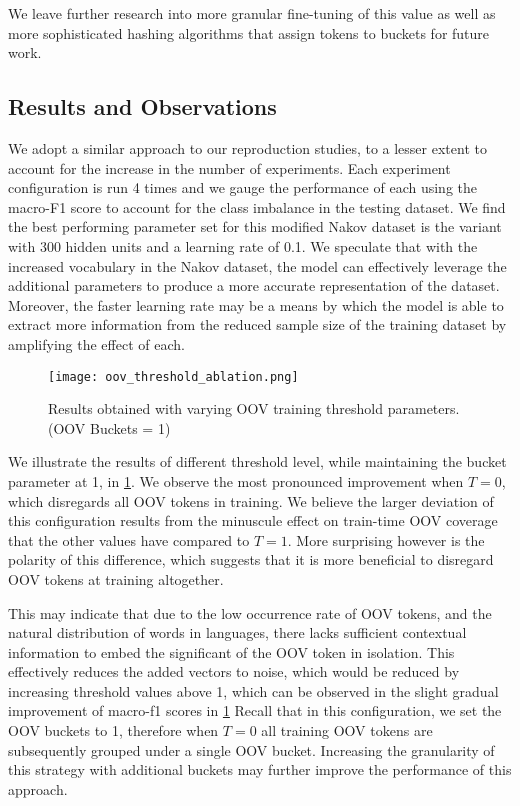 \documentclass[../../fyp.tex]{subfiles}
\begin{document}
We leave further research into more granular fine-tuning of this value as well as more sophisticated hashing algorithms that assign tokens to buckets for future work. 

\subsection{Results and Observations}

We adopt a similar approach to our reproduction studies, to a lesser extent to account for the increase in the number of experiments. Each experiment configuration is run 4 times and we gauge the performance of each using the macro-F1 score to account for the class imbalance in the testing dataset. We find the best performing parameter set for this modified Nakov dataset is the variant with 300 hidden units and a learning rate of 0.1. We speculate that with the increased vocabulary in the Nakov dataset, the model can effectively leverage the additional parameters to produce a more accurate representation of the dataset. Moreover, the faster learning rate may be a means by which the model is able to extract more information from the reduced sample size of the training dataset by amplifying the effect of each. 

\begin{figure}[!ht]
	\centering
	\texttt{[image: oov\_threshold\_ablation.png]}
	\caption{Results obtained with varying OOV training threshold parameters. (OOV Buckets = 1)}
	\label{fig:oov_threshold_ablation}
\end{figure}

We illustrate the results of different threshold level, while maintaining the bucket parameter at 1, in \ref{fig:oov_threshold_ablation}. We observe the most pronounced improvement when $T=0$, which disregards all OOV tokens in training. We believe the larger deviation of this configuration results from the minuscule effect on train-time OOV coverage that the other values have compared to $T=1$. More surprising however is the polarity of this difference, which suggests that it is more beneficial to disregard OOV tokens at training altogether. 

This may indicate that due to the low occurrence rate of OOV tokens, and the natural distribution of words in languages, there lacks sufficient contextual information to embed the significant of the OOV token in isolation. This effectively reduces the added vectors to noise, which would be reduced by increasing threshold values above 1, which can be observed in the slight gradual improvement of macro-f1 scores in \ref{fig:oov_threshold_ablation}  Recall that in this configuration, we set the OOV buckets to 1, therefore when $T=0$ all training OOV tokens are subsequently grouped under a single OOV bucket. Increasing the granularity of this strategy with additional buckets may further improve the performance of this approach.
\end{document}
